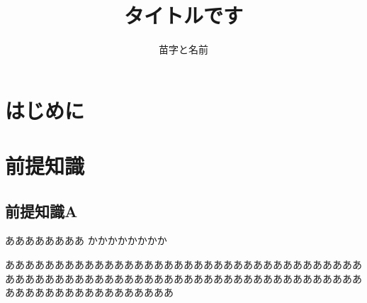 \documentclass[a4j]{jarticle}
\date{}
\begin{document}
\makeatletter %
	\def\@thesis{平成28年度 東邦大学理学部情報科学科 卒業研究}
	\def\id#1{\def\@id{#1}}
	\def\department#1{\def\@department{#1}}
	
	\def\@maketitle{
		\begin{center}
			\vspace{10mm}
			{\large \@thesis \par}	%
			\vspace{50mm}
			{\huge\bf \@title \par}	%
			\vspace{15mm}
			{\Large 学籍番号　\@id \par}	%
			\vspace{5mm}
			{\Large \@author \par}	%
			\vspace{50mm}
		\end{center}
		\begin{flushright}
			{\large 金岡研究室}
		\end{flushright}
	}
\makeatother

\title{タイトルです} %
\id{55000000} %
\author{苗字と名前} %
\maketitle{\title} %
\thispagestyle{empty} %
\newpage %

\tableofcontents %

\newpage
\section{はじめに} 

\newpage
\section{前提知識}
\subsection{前提知識A}

ああああああああ
かかかかかかかか

あああああああああああああああああああああああああああああああああああああああああああああああああああああああああああああああああああああああああああああああああああああああああ
\end{document}
